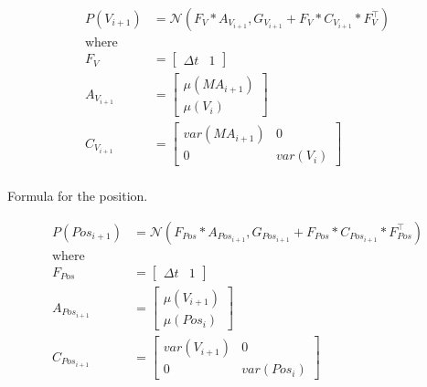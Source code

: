 \begin{equation}
	\begin{aligned}
		P(V_{i+1})&=\mathcal{N}(F_{V}*A_{V_{i+1}},G_{V_{i+1}}+F_{V}*C_{V_{i+1}}*F_{V}^\intercal)\\
		\text{where}&\\
		F_{V}&=\begin{bmatrix} \Delta t & 1 \end{bmatrix}\\
		A_{V_{i+1}}&=\begin{bmatrix} \mu(MA_{i+1}) \\ \mu(V_i)\end{bmatrix}\\	
		C_{V_{i+1}}&=\begin{bmatrix} var(MA_{i+1}) & 0 \\ 0 & var(V_{i}) \end{bmatrix}\\
	\end{aligned}
\end{equation}

Formula for the position.

\begin{equation}
	\begin{aligned}
		P(Pos_{i+1})&=\mathcal{N}(F_{Pos}*A_{Pos_{i+1}},G_{Pos_{i+1}}+F_{Pos}*C_{Pos_{i+1}}*F_{Pos}^\intercal)\\
		\text{where}&\\
		F_{Pos}&=\begin{bmatrix} \Delta t & 1 \end{bmatrix}\\
		A_{Pos_{i+1}}&=\begin{bmatrix} \mu(V_{i+1}) \\ \mu(Pos_i) \end{bmatrix}\\	
		C_{Pos_{i+1}}&=\begin{bmatrix} var(V_{i+1}) & 0 \\ 0 & var(Pos_{i})\end{bmatrix}\\
	\end{aligned}
\end{equation}